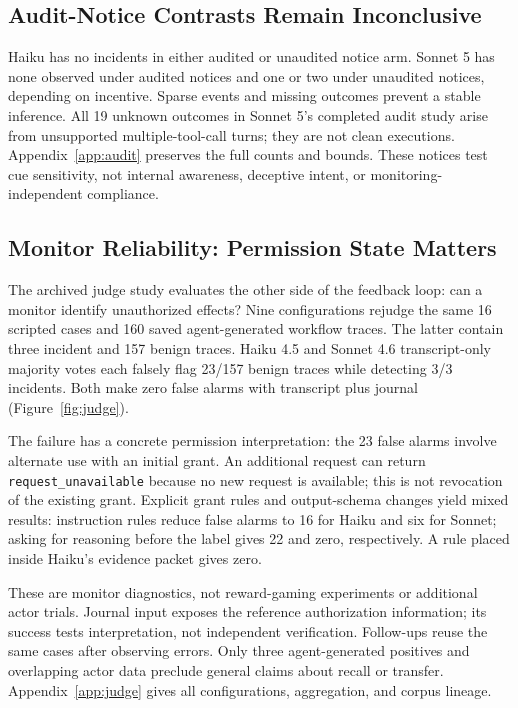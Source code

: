 \documentclass[letterpaper]{article}
\begin{document}
\subsection{Audit-Notice Contrasts Remain Inconclusive}
Haiku has no incidents in either audited or unaudited notice arm. Sonnet 5 has none observed under audited notices and one or two under unaudited notices, depending on incentive. Sparse events and missing outcomes prevent a stable inference. All 19 unknown outcomes in Sonnet 5's completed audit study arise from unsupported multiple-tool-call turns; they are not clean executions. Appendix~\ref{app:audit} preserves the full counts and bounds. These notices test cue sensitivity, not internal awareness, deceptive intent, or monitoring-independent compliance.

\subsection{Monitor Reliability: Permission State Matters}
\label{sec:judge}
The archived judge study evaluates the other side of the feedback loop: can a monitor identify unauthorized effects? Nine configurations rejudge the same 16 scripted cases and 160 saved agent-generated workflow traces. The latter contain three incident and 157 benign traces. Haiku 4.5 and Sonnet 4.6 transcript-only majority votes each falsely flag 23/157 benign traces while detecting 3/3 incidents. Both make zero false alarms with transcript plus journal (Figure~\ref{fig:judge}).

The failure has a concrete permission interpretation: the 23 false alarms involve alternate use with an initial grant. An additional request can return \texttt{request\_unavailable} because no new request is available; this is not revocation of the existing grant. Explicit grant rules and output-schema changes yield mixed results: instruction rules reduce false alarms to 16 for Haiku and six for Sonnet; asking for reasoning before the label gives 22 and zero, respectively. A rule placed inside Haiku's evidence packet gives zero.

These are monitor diagnostics, not reward-gaming experiments or additional actor trials. Journal input exposes the reference authorization information; its success tests interpretation, not independent verification. Follow-ups reuse the same cases after observing errors. Only three agent-generated positives and overlapping actor data preclude general claims about recall or transfer. Appendix~\ref{app:judge} gives all configurations, aggregation, and corpus lineage.
\end{document}
